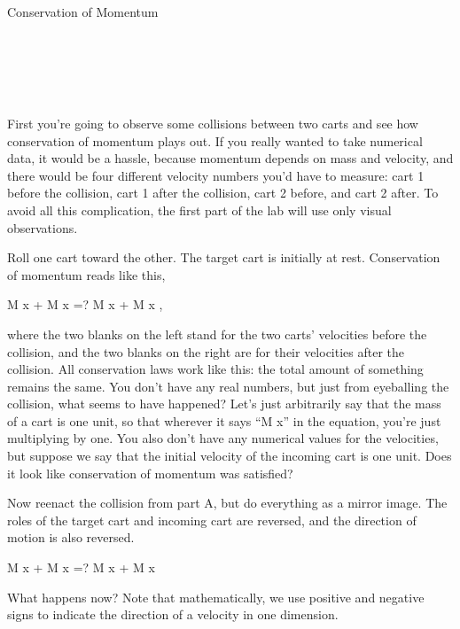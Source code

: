 \begin{lab}{Conservation of Momentum}

\apparatus
{}\\
\\
\\
\\

First you're going to observe some collisions between two carts and see how conservation of momentum plays out. If you really wanted to take numerical data, it would be a hassle, because momentum depends on mass and velocity, and there would be four different velocity numbers you'd have to measure: cart 1 before the collision, cart 1 after the collision, cart 2 before, and cart 2 after. To avoid all this complication, the first part of the lab will use only visual observations.

Roll one cart toward the other. The target cart is initially at rest. Conservation of momentum reads like this,

        M x \fillinblank + M x \fillinblank =? M x \fillinblank + M x \fillinblank   ,

where the two blanks on the left stand for the two carts' velocities before the collision, and the two blanks on the right are for their velocities after the collision. All conservation laws work like this: the total amount of something remains the same. You don't have any real numbers, but just from eyeballing the collision, what seems to have happened? Let's just arbitrarily say that the mass of a cart is one unit, so that wherever it says ``M x'' in the equation, you're just multiplying by one. You also don't have any numerical values for the velocities, but suppose we say that the initial velocity of the incoming cart is one unit. Does it look like conservation of momentum was satisfied?

Now reenact the collision from part A, but do everything as a mirror image. The roles of the target cart and incoming cart are reversed, and the direction of motion is also reversed.

        M x \fillinblank + M x \fillinblank =? M x \fillinblank + M x \fillinblank   

What happens now? Note that mathematically, we use positive and negative signs to indicate the direction of a velocity in one dimension.


\end{lab}
